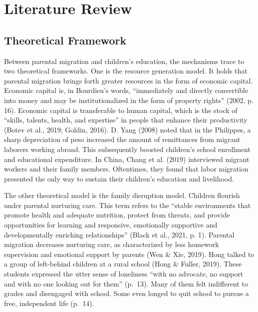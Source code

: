 \documentclass[
  man,floatsintext]{apa7}
\begin{document}
\newpage

\hypertarget{literature-review}{%
\section{Literature Review}\label{literature-review}}

\hypertarget{theoretical-framework}{%
\subsection{Theoretical Framework}\label{theoretical-framework}}

Between parental migration and children's education, the mechanisms trace to two theoretical frameworks. One is the resource generation model. It holds that parental migration brings forth greater resources in the form of economic capital. Economic capital is, in Bourdieu's words, ``immediately and directly convertible into money and may be institutionalized in the form of property rights'' (2002, p. 16). Economic capital is transferable to human capital, which is the stock of ``skills, talents, health, and expertise'' in people that enhance their productivity (Botev et al., 2019; Goldin, 2016). D. Yang (2008) noted that in the Philippes, a sharp depreciation of peso increased the amount of remittances from migrant laborers working abroad. This subsequently boosted children's school enrollment and educational expenditure. In China, Chang et al. (2019) interviewed migrant workers and their family members. Oftentimes, they found that labor migration presented the only way to sustain their children's education and livelihood.

The other theoretical model is the family disruption model. Children flourish under parental nurturing care. This term refers to the ``stable environments that promote health and adequate nutrition, protect from threats, and provide opportunities for learning and responsive, emotionally supportive and developmentally enriching relationships'' (Black et al., 2021, p. 1). Parental migration decreases nurturing care, as characterized by less homework supervision and emotional support by parents (Wen \& Xie, 2019). Hong talked to a group of left-behind children at a rural school (Hong \& Fuller, 2019). These students expressed the utter sense of loneliness ``with no advocate, no support and with no one looking out for them'' (p.~13). Many of them felt indifferent to grades and disengaged with school. Some even longed to quit school to pursue a free, independent life (p.~14).
\end{document}

